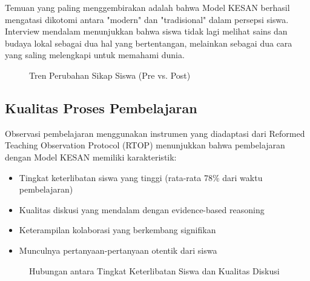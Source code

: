\documentclass[12pt,a4paper,oneside]{book}
\begin{document}
Temuan yang paling menggembirakan adalah bahwa Model KESAN berhasil mengatasi dikotomi antara "modern" dan "tradisional" dalam persepsi siswa. Interview mendalam menunjukkan bahwa siswa tidak lagi melihat sains dan budaya lokal sebagai dua hal yang bertentangan, melainkan sebagai dua cara yang saling melengkapi untuk memahami dunia.

\begin{figure}[H]
  \centering
  \caption{Tren Perubahan Sikap Siswa (Pre vs. Post)}
  \label{fig:sikap_trend}
\end{figure}

\subsection{Kualitas Proses Pembelajaran}

Observasi pembelajaran menggunakan instrumen yang diadaptasi dari Reformed Teaching Observation Protocol (RTOP) menunjukkan bahwa pembelajaran dengan Model KESAN memiliki karakteristik:
\begin{itemize}
\item Tingkat keterlibatan siswa yang tinggi (rata-rata 78\% dari waktu pembelajaran)
\item Kualitas diskusi yang mendalam dengan evidence-based reasoning
\item Keterampilan kolaborasi yang berkembang signifikan
\item Munculnya pertanyaan-pertanyaan otentik dari siswa
\end{itemize}

\begin{figure}[H]
  \centering
  \caption{Hubungan antara Tingkat Keterlibatan Siswa dan Kualitas Diskusi}
  \label{fig:keterlibatan_kualitas}
\end{figure}
\end{document}
